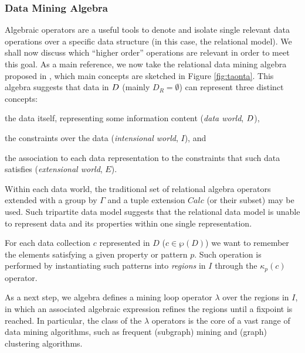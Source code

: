 \subsubsection{Data Mining Algebra}\label{subsec:dmalgebra}
Algebraic operators are a useful tools to denote and isolate single relevant data operations over a specific data structure (in this case, the relational model).   We shall now discuss which ``higher order'' operations are relevant in order to meet this goal. As a main reference, we now take the relational data mining algebra proposed in \cite{Calders2006}, which main concepts are sketched in Figure \ref{fig:taonta}. This algebra suggests that data in $\data$ (mainly $D_R=\emptyset$) can represent three distinct concepts: \begin{mylist}
	\item the data itself, representing some information content (\textit{data world}, $\data$),
	\item the constraints over the data (\textit{intensional world}, $I$), and
	\item the association to each data representation to the constraints that such data satisfies (\textit{extensional world}, $E$).
\end{mylist}
Within each data world, the traditional set of relational algebra operators extended with a group by $\Gamma$ and a tuple extension $Calc$ (or their subset) may be used. Such tripartite data model suggests that the relational data model is unable to represent data and its properties within one single representation.


For each data collection $c$ represented in $D$ ($c\in \wp(D)$) we want to remember the elements satisfying a given property or pattern $p$. Such operation is performed by instantiating such patterns into \textit{regions} in $I$ through the $\kappa_p(c)$ operator.

As a next step, we algebra defines a mining loop operator $\lambda$\index{$\lambda$} over the regions in $I$, in which an associated algebraic expression refines the regions until a fixpoint is reached. In particular, the class of the $\lambda$ operators is the core of a vast range of data mining algorithms, such as frequent (subgraph) mining \cite{JunghannsKAPR17} and (graph) clustering \cite{vanDongen2012} algorithms. 

